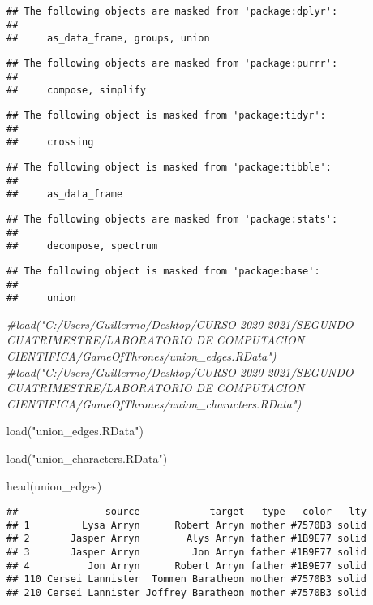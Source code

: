 \documentclass[
]{book}
\newenvironment{Shaded}{\begin{snugshade}}{\end{snugshade}}
\newcommand{\CommentTok}[1]{\textcolor[rgb]{0.56,0.35,0.01}{\textit{#1}}}
\newcommand{\FunctionTok}[1]{\textcolor[rgb]{0.00,0.00,0.00}{#1}}
\newcommand{\NormalTok}[1]{#1}
\newcommand{\StringTok}[1]{\textcolor[rgb]{0.31,0.60,0.02}{#1}}
\begin{document}
\begin{verbatim}
## The following objects are masked from 'package:dplyr':
## 
##     as_data_frame, groups, union
\end{verbatim}

\begin{verbatim}
## The following objects are masked from 'package:purrr':
## 
##     compose, simplify
\end{verbatim}

\begin{verbatim}
## The following object is masked from 'package:tidyr':
## 
##     crossing
\end{verbatim}

\begin{verbatim}
## The following object is masked from 'package:tibble':
## 
##     as_data_frame
\end{verbatim}

\begin{verbatim}
## The following objects are masked from 'package:stats':
## 
##     decompose, spectrum
\end{verbatim}

\begin{verbatim}
## The following object is masked from 'package:base':
## 
##     union
\end{verbatim}

\begin{Shaded}
\begin{Highlighting}[]
\CommentTok{\#load("C:/Users/Guillermo/Desktop/CURSO 2020{-}2021/SEGUNDO CUATRIMESTRE/LABORATORIO DE COMPUTACION CIENTIFICA/GameOfThrones/union\_edges.RData")}
\CommentTok{\#load("C:/Users/Guillermo/Desktop/CURSO 2020{-}2021/SEGUNDO CUATRIMESTRE/LABORATORIO DE COMPUTACION CIENTIFICA/GameOfThrones/union\_characters.RData")}

\FunctionTok{load}\NormalTok{(}\StringTok{"union\_edges.RData"}\NormalTok{)}

\FunctionTok{load}\NormalTok{(}\StringTok{"union\_characters.RData"}\NormalTok{)}
\end{Highlighting}
\end{Shaded}

\begin{Shaded}
\begin{Highlighting}[]
\FunctionTok{head}\NormalTok{(union\_edges)}
\end{Highlighting}
\end{Shaded}

\begin{verbatim}
##               source            target   type   color   lty
## 1         Lysa Arryn      Robert Arryn mother #7570B3 solid
## 2       Jasper Arryn        Alys Arryn father #1B9E77 solid
## 3       Jasper Arryn         Jon Arryn father #1B9E77 solid
## 4          Jon Arryn      Robert Arryn father #1B9E77 solid
## 110 Cersei Lannister  Tommen Baratheon mother #7570B3 solid
## 210 Cersei Lannister Joffrey Baratheon mother #7570B3 solid
\end{verbatim}
\end{document}
